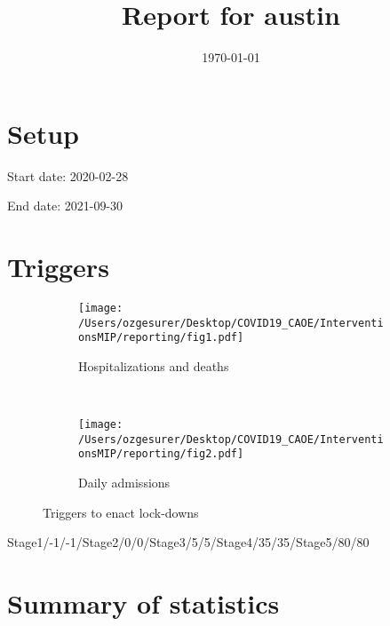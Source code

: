 \documentclass{article}
\title{Report for austin}
\author{}
\date{\today}
\begin{document}
\maketitle

\section*{Setup}

Start date: 2020-02-28

End date: 2021-09-30 




\section*{Triggers}
\begin{figure}[!htb]
  \centering
  \setlength{\unitlength}{1cm}
    \begin{subfigure}[b]{0.475\linewidth}
    \centering
        \texttt{[image: /Users/ozgesurer/Desktop/COVID19\_CAOE/InterventionsMIP/reporting/fig1.pdf]}
        \caption{Hospitalizations  and deaths}
        \label{fig:IHD}
    \end{subfigure}
    ~
    \begin{subfigure}[b]{0.475\linewidth}
    \centering
         \texttt{[image: /Users/ozgesurer/Desktop/COVID19\_CAOE/InterventionsMIP/reporting/fig2.pdf]}
        \caption{Daily admissions}
        \label{fig:IYIH}
    \end{subfigure}
    \caption{Triggers to enact lock-downs}\label{fig:SD90}
\end{figure}

Stage1/-1/-1/Stage2/0/0/Stage3/5/5/Stage4/35/35/Stage5/80/80

\newpage

\section*{Summary of statistics}
\end{document}
